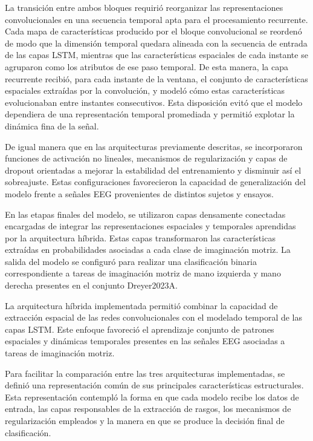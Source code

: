 La transición entre ambos bloques requirió reorganizar las representaciones convolucionales en una secuencia temporal apta para el procesamiento recurrente. Cada mapa de características producido por el bloque convolucional se reordenó de modo que la dimensión temporal quedara alineada con la secuencia de entrada de las capas LSTM, mientras que las características espaciales de cada instante se agruparon como los atributos de ese paso temporal. De esta manera, la capa recurrente recibió, para cada instante de la ventana, el conjunto de características espaciales extraídas por la convolución, y modeló cómo estas características evolucionaban entre instantes consecutivos. Esta disposición evitó que el modelo dependiera de una representación temporal promediada y permitió explotar la dinámica fina de la señal.

De igual manera que en las arquitecturas previamente descritas, se incorporaron funciones de activación no lineales, mecanismos de regularización y capas de dropout orientadas a mejorar la estabilidad del entrenamiento y disminuir así el sobreajuste. Estas configuraciones favorecieron la capacidad de generalización del modelo frente a señales EEG provenientes de distintos sujetos y ensayos.

En las etapas finales del modelo, se utilizaron capas densamente conectadas encargadas de integrar las representaciones espaciales y temporales aprendidas por la arquitectura híbrida. Estas capas transformaron las características extraídas en probabilidades asociadas a cada clase de imaginación motriz. La salida del modelo se configuró para realizar una clasificación binaria correspondiente a tareas de imaginación motriz de mano izquierda y mano derecha presentes en el conjunto Dreyer2023A.

La arquitectura híbrida implementada permitió combinar la capacidad de extracción espacial de las redes convolucionales con el modelado temporal de las capas LSTM. Este enfoque favoreció el aprendizaje conjunto de patrones espaciales y dinámicas temporales presentes en las señales EEG asociadas a tareas de imaginación motriz.

Para facilitar la comparación entre las tres arquitecturas implementadas, se definió una representación común de sus principales características estructurales. Esta representación contempló la forma en que cada modelo recibe los datos de entrada, las capas responsables de la extracción de rasgos, los mecanismos de regularización empleados y la manera en que se produce la decisión final de clasificación.

